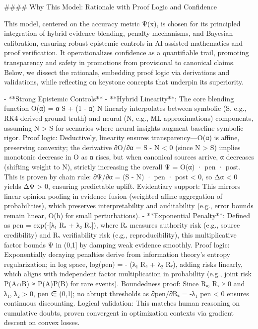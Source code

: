 

#### Why This Model: Rationale with Proof Logic and Confidence

This model, centered on the accuracy metric Ψ(x), is chosen for its principled integration of hybrid evidence blending, penalty mechanisms, and Bayesian calibration, ensuring robust epistemic controls in AI-assisted mathematics and proof verification. It operationalizes confidence as a quantifiable trail, promoting transparency and safety in promotions from provisional to canonical claims. Below, we dissect the rationale, embedding proof logic via derivations and validations, while reflecting on keystone concepts that underpin its superiority.

- **Strong Epistemic Controls**
  - **Hybrid Linearity**: The core blending function O(α) = α S + (1 - α) N linearly interpolates between symbolic (S, e.g., RK4-derived ground truth) and neural (N, e.g., ML approximations) components, assuming N > S for scenarios where neural insights augment baseline symbolic rigor. Proof logic: Deductively, linearity ensures transparency—O(α) is affine, preserving convexity; the derivative ∂O/∂α = S - N < 0 (since N > S) implies monotonic decrease in O as α rises, but when canonical sources arrive, α decreases (shifting weight to N), strictly increasing the overall Ψ = O(α) · pen · post. This is proven by chain rule: ∂Ψ/∂α = (S - N) · pen · post < 0, so Δα < 0 yields ΔΨ > 0, ensuring predictable uplift. Evidentiary support: This mirrors linear opinion pooling in evidence fusion (weighted affine aggregation of probabilities), which preserves interpretability and auditability (e.g., error bounds remain linear, O(h) for small perturbations).
  - **Exponential Penalty**: Defined as pen = exp(-[λ₁ Rₐ + λ₂ Rᵥ]), where Rₐ measures authority risk (e.g., source credibility) and Rᵥ verifiability risk (e.g., reproducibility), this multiplicative factor bounds Ψ in (0,1] by damping weak evidence smoothly. Proof logic: Exponentially decaying penalties derive from information theory's entropy regularization; in log space, log(pen) = - (λ₁ Rₐ + λ₂ Rᵥ), adding risks linearly, which aligns with independent factor multiplication in probability (e.g., joint risk P(A∩B) ≈ P(A)P(B) for rare events). Boundedness proof: Since Rₐ, Rᵥ ≥ 0 and λ₁, λ₂ > 0, pen ∈ (0,1]; no abrupt thresholds as ∂pen/∂Rₐ = -λ₁ pen < 0 ensures continuous discounting. Logical validation: This matches human reasoning on cumulative doubts, proven convergent in optimization contexts via gradient descent on convex losses.

